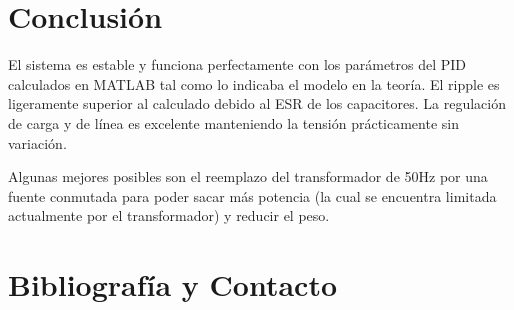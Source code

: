 \documentclass[12pt]{report}
\begin{document}
\chapter{Conclusión}

El sistema es estable y funciona perfectamente con los parámetros del PID calculados en MATLAB tal como lo indicaba el modelo en la teoría. El ripple es ligeramente superior al calculado debido al ESR de los capacitores. La regulación de carga y de línea es excelente manteniendo la tensión prácticamente sin variación.

Algunas mejores posibles son el reemplazo del transformador de 50Hz por una fuente conmutada para poder sacar más potencia (la cual se encuentra limitada actualmente por el transformador) y reducir el peso. 

\newpage
\chapter{Bibliografía y Contacto}
\end{document}
